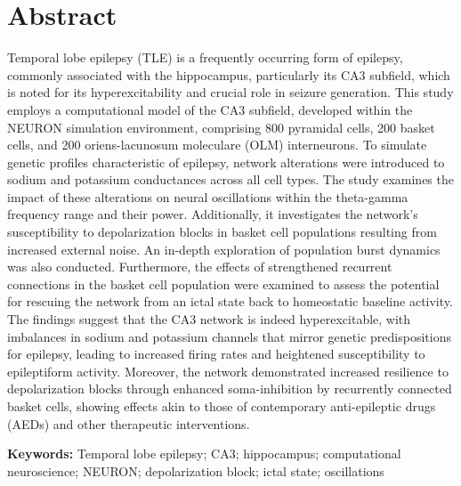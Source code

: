 \section*{Abstract}
Temporal lobe epilepsy (TLE) is a frequently occurring form of epilepsy, commonly
associated with the hippocampus, particularly its CA3 subfield, which is noted
for its hyperexcitability and crucial role in seizure generation. This study
employs a computational model of the CA3 subfield, developed within the NEURON
simulation environment, comprising 800 pyramidal cells, 200 basket cells, and 200
oriens-lacunosum moleculare (OLM) interneurons. To simulate genetic profiles
characteristic of epilepsy, network alterations were introduced to sodium and
potassium conductances across all cell types. The study examines the impact of
these alterations on neural oscillations within the theta-gamma frequency range
and their power. Additionally, it investigates the network's susceptibility to
depolarization blocks in basket cell populations resulting from increased external
noise. An in-depth exploration of population burst dynamics was also conducted.
Furthermore, the effects of strengthened recurrent connections in the basket cell
population were examined to assess the potential for rescuing the network from an
ictal state back to homeostatic baseline activity. The findings suggest that the
CA3 network is indeed hyperexcitable, with imbalances in sodium and potassium
channels that mirror genetic predispositions for epilepsy, leading to increased
firing rates and heightened susceptibility to epileptiform activity. Moreover, the
network demonstrated increased resilience to depolarization blocks through enhanced
soma-inhibition by recurrently connected basket cells, showing effects akin to
those of contemporary anti-epileptic drugs (AEDs) and other therapeutic interventions.

\textbf{Keywords:} Temporal lobe epilepsy; CA3; hippocampus; computational neuroscience; NEURON\@;
depolarization block; ictal state; oscillations